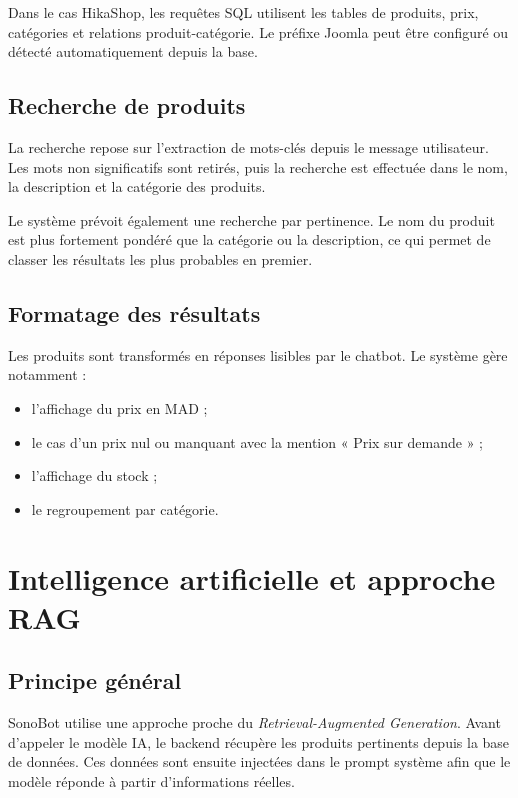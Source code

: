 \documentclass[12pt,a4paper]{report}
\begin{document}
Dans le cas HikaShop, les requêtes SQL utilisent les tables de produits, prix, catégories et relations produit-catégorie. Le préfixe Joomla peut être configuré ou détecté automatiquement depuis la base.

\section{Recherche de produits}

La recherche repose sur l'extraction de mots-clés depuis le message utilisateur. Les mots non significatifs sont retirés, puis la recherche est effectuée dans le nom, la description et la catégorie des produits.

Le système prévoit également une recherche par pertinence. Le nom du produit est plus fortement pondéré que la catégorie ou la description, ce qui permet de classer les résultats les plus probables en premier.

\section{Formatage des résultats}

Les produits sont transformés en réponses lisibles par le chatbot. Le système gère notamment :

\begin{itemize}
    \item l'affichage du prix en MAD ;
    \item le cas d'un prix nul ou manquant avec la mention « Prix sur demande » ;
    \item l'affichage du stock ;
    \item le regroupement par catégorie.
\end{itemize}

\chapter{Intelligence artificielle et approche RAG}

\section{Principe général}

SonoBot utilise une approche proche du \textit{Retrieval-Augmented Generation}. Avant d'appeler le modèle IA, le backend récupère les produits pertinents depuis la base de données. Ces données sont ensuite injectées dans le prompt système afin que le modèle réponde à partir d'informations réelles.
\end{document}
